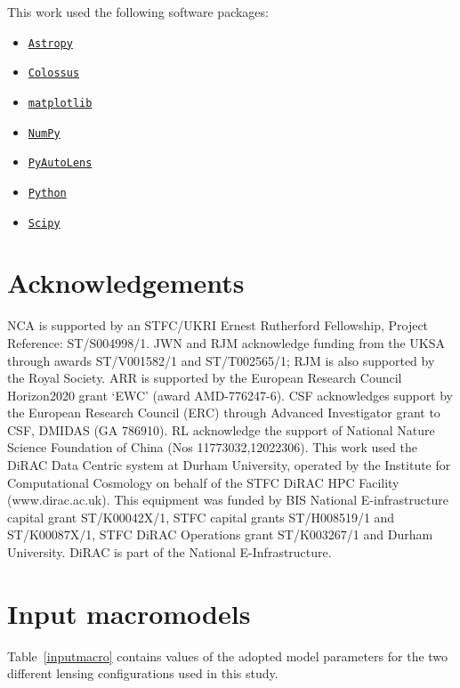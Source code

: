 \documentclass[a4paper, fleqn, usenatbib, useAMS]{mnras}
\def\textt{\texttt}
\begin{document}
This work used the following software packages:
\begin{itemize}
\item 
\href{https://github.com/astropy/astropy}{\textt{Astropy}} 
\citep{astropy1, astropy2}
\item
\href{https://bitbucket.org/bdiemer/colossus/src/master/}{\textt{Colossus}}
\citep{colossus}
\item 
\href{https://github.com/matplotlib/matplotlib}{\textt{matplotlib}} 
\citep{matplotlib}
\item 
\href{https://github.com/numpy/numpy}{\textt{NumPy}} 
\citep{numpy}
\item 
\href{https://github.com/Jammy2211/PyAutoLens}{\textt{PyAutoLens}} 
\citep{Nightingale2015, Nightingale2018, Nightingale2021}
\item 
\href{https://www.python.org/}{\textt{Python}} 
\citep{python}
\item 
\href{https://github.com/scipy/scipy}{\textt{Scipy}}
\citep{scipy}
\end{itemize}


\section*{Acknowledgements}
NCA is supported by an STFC/UKRI Ernest Rutherford Fellowship, Project Reference: ST/S004998/1.
JWN and RJM acknowledge funding from the UKSA through awards ST/V001582/1 and ST/T002565/1; RJM is also supported by the Royal Society. ARR is supported by the European Research Council Horizon2020 grant `EWC' (award AMD-776247-6). CSF acknowledges support by the European Research Council (ERC) through Advanced Investigator grant to CSF, DMIDAS (GA 786910). RL acknowledge the support of National Nature Science Foundation of China (Nos 11773032,12022306).
This work used the DiRAC Data Centric system at Durham
University, operated by the Institute for Computational Cosmology
on behalf of the STFC DiRAC HPC Facility (www.dirac.ac.uk).
This equipment was funded by BIS National E-infrastructure capital 
grant ST/K00042X/1, STFC capital grants ST/H008519/1 and
ST/K00087X/1, STFC DiRAC Operations grant ST/K003267/1 and 
Durham University. DiRAC is part of the National E-Infrastructure.

\appendix

\section{Input macromodels}
Table~\ref{inputmacro} contains values of the adopted model parameters
for the two different lensing configurations used in this study.
\end{document}
